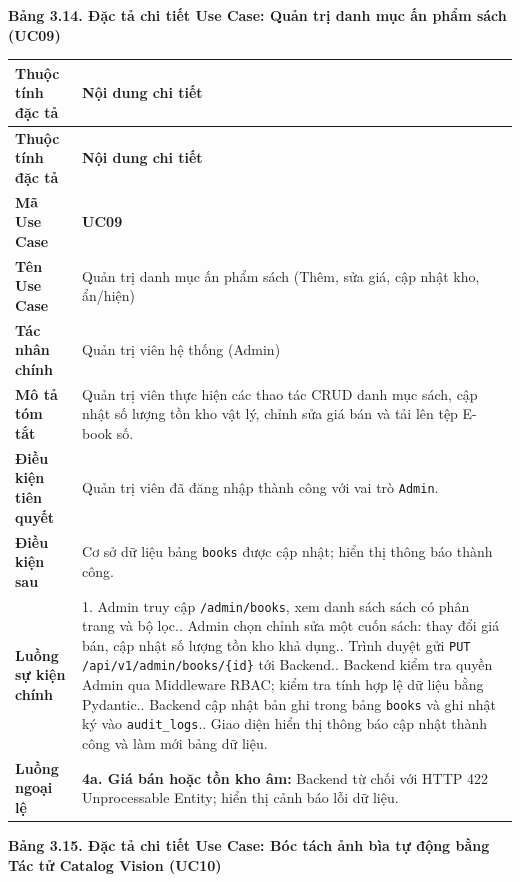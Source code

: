 \documentclass[11pt, a4paper]{report}
\begin{document}
\vspace{0.3cm}
\noindent\textbf{Bảng 3.14. Đặc tả chi tiết Use Case: Quản trị danh mục ấn phẩm sách (UC09)}

\begin{longtable}{p{3.8cm} p{10.5cm}}
\toprule
\textbf{Thuộc tính đặc tả} & \textbf{Nội dung chi tiết} \\
\midrule
\endfirsthead
\toprule
\textbf{Thuộc tính đặc tả} & \textbf{Nội dung chi tiết} \\
\midrule
\endhead
\bottomrule
\endfoot
\textbf{Mã Use Case} & \textbf{UC09} \\
\midrule
\textbf{Tên Use Case} & Quản trị danh mục ấn phẩm sách (Thêm, sửa giá, cập nhật kho, ẩn/hiện) \\
\midrule
\textbf{Tác nhân chính} & Quản trị viên hệ thống (Admin) \\
\midrule
\textbf{Mô tả tóm tắt} & Quản trị viên thực hiện các thao tác CRUD danh mục sách, cập nhật số lượng tồn kho vật lý, chỉnh sửa giá bán và tải lên tệp E-book số. \\
\midrule
\textbf{Điều kiện tiên quyết} & Quản trị viên đã đăng nhập thành công với vai trò \texttt{Admin}. \\
\midrule
\textbf{Điều kiện sau} & Cơ sở dữ liệu bảng \texttt{books} được cập nhật; hiển thị thông báo thành công. \\
\midrule
\textbf{Luồng sự kiện chính} & 
1. Admin truy cập \texttt{/admin/books}, xem danh sách sách có phân trang và bộ lọc.\newline
2. Admin chọn chỉnh sửa một cuốn sách: thay đổi giá bán, cập nhật số lượng tồn kho khả dụng.\newline
3. Trình duyệt gửi \texttt{PUT /api/v1/admin/books/\{id\}} tới Backend.\newline
4. Backend kiểm tra quyền Admin qua Middleware RBAC; kiểm tra tính hợp lệ dữ liệu bằng Pydantic.\newline
5. Backend cập nhật bản ghi trong bảng \texttt{books} và ghi nhật ký vào \texttt{audit\_logs}.\newline
6. Giao diện hiển thị thông báo cập nhật thành công và làm mới bảng dữ liệu. \\
\midrule
\textbf{Luồng ngoại lệ} & 
\textbf{4a. Giá bán hoặc tồn kho âm:} Backend từ chối với HTTP 422 Unprocessable Entity; hiển thị cảnh báo lỗi dữ liệu. \\
\bottomrule
\end{longtable}

\vspace{0.3cm}
\noindent\textbf{Bảng 3.15. Đặc tả chi tiết Use Case: Bóc tách ảnh bìa tự động bằng Tác tử Catalog Vision (UC10)}
\end{document}
